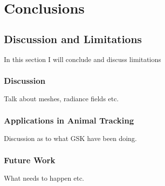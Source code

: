 
\chapter{Conclusions}

\ifpdf
    \graphicspath{{Chapter6/Figs/Raster/}{Chapter6/Figs/PDF/}{Chapter6/Figs/}}
\else
    \graphicspath{{Chapter6/Figs/Vector/}{Chapter6/Figs/}}
\fi

\section{Discussion and Limitations}

In this section I will conclude and discuss limitations

\subsection{Discussion}

Talk about meshes, radiance fields etc.

\subsection{Applications in Animal Tracking}

Discussion as to what GSK have been doing.

\subsection{Future Work}

What needs to happen etc.


